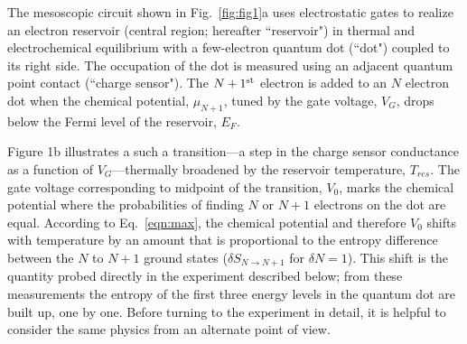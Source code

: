 \documentclass[twocolumn,showpacs,preprintnumbers,amsmath,amssymb,pra,aps,superscriptaddress]{revtex4-1}
\begin{document}
The mesoscopic circuit shown in Fig.~\ref{fig:fig1}a uses electrostatic gates to realize an electron reservoir (central region; hereafter ``reservoir") in thermal and electrochemical equilibrium with a few-electron quantum dot (``dot") coupled to its right side.  The occupation of the dot is measured using an adjacent quantum point contact (``charge sensor")\cite{Staring2007, Frolov2009, Thierschmann2015}.  The $N+1^{\rm st}$ electron is added to an $N$ electron dot when the chemical potential, $\mu_{N+1}$, tuned by the gate voltage, $V_G$, drops below the Fermi level of the reservoir, $E_F$.  

Figure 1b illustrates a such a transition---a step in the charge sensor conductance as a function of $V_G$---thermally broadened by the reservoir temperature, $T_{res}$.  The gate voltage corresponding to midpoint of the transition, $V_0$, marks the chemical potential where the probabilities of finding $N$ or $N+1$ electrons on the dot are equal.
According to Eq.~\ref{eqn:max}, the chemical potential and therefore $V_0$ shifts with temperature by an amount that is proportional to the entropy difference between the $N$ to $N+1$ ground states ($\delta S_{N\rightarrow N+1}$ for $\delta N=1$).  This shift is the quantity probed directly in the experiment described below; from these measurements the entropy of the first three energy levels in the quantum dot are built up, one by one.  Before turning to the experiment in detail, it is helpful to consider the same physics from an alternate point of view.
  
\end{document}
